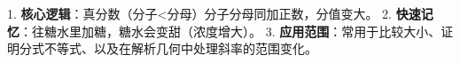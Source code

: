 \begin{summarybox}
1. \textbf{核心逻辑}：真分数（分子<分母）分子分母同加正数，分值变大。
2. \textbf{快速记忆}：往糖水里加糖，糖水会变甜（浓度增大）。
3. \textbf{应用范围}：常用于比较大小、证明分式不等式、以及在解析几何中处理斜率的范围变化。
\end{summarybox}